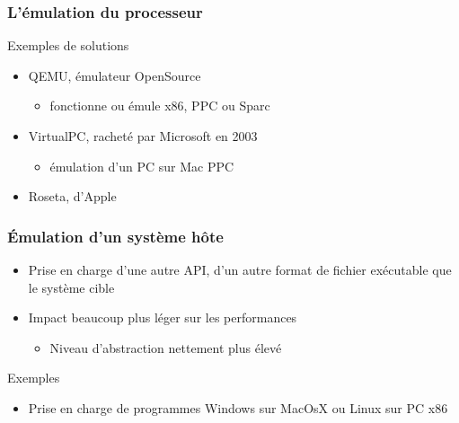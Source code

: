\begin{frame}
\frametitle{L’émulation du processeur}
\begin{exampleblock}{Exemples de solutions}
\begin{itemize}
\item QEMU, émulateur OpenSource
\begin{itemize}
\item fonctionne ou émule x86, PPC ou Sparc
\end{itemize}
\item VirtualPC, racheté par Microsoft en 2003
\begin{itemize}
\item émulation d'un PC sur Mac PPC
\end{itemize}
\item Roseta, d'Apple
\end{itemize}
\end{exampleblock}
\end{frame}

\begin{frame}
\frametitle{Émulation d'un système hôte}
\begin{itemize}
\item Prise en charge d'une autre API, d'un autre format de fichier exécutable que le système cible
\item Impact beaucoup plus léger sur les performances
\begin{itemize}
\item Niveau d'abstraction nettement plus élevé
\end{itemize}
\end{itemize}
\begin{exampleblock}{Exemples}
\begin{itemize}
\item Prise en charge de programmes Windows sur MacOsX ou Linux sur PC x86
\end{itemize}
\end{exampleblock}
\end{frame}

